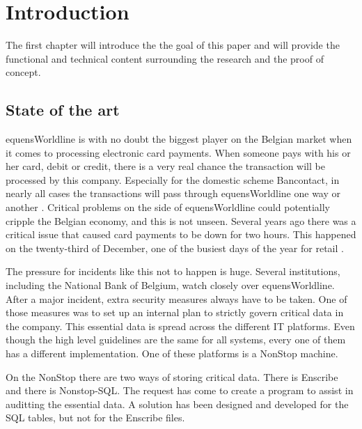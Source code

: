 
\chapter{Introduction}
\label{ch:inleiding}

The first chapter will introduce the the goal of this paper and will provide the functional and technical content surrounding the research and the proof of concept.

\section{State of the art}
\label{sec:stand-van-zaken}

equensWorldline is with no doubt the biggest player on the Belgian market when it comes to processing electronic card payments.
When someone pays with his or her card, debit or credit, there is a very real chance the transaction will be processed by this company.
Especially for the domestic scheme Bancontact, in nearly all cases the transactions will pass through equensWorldline one way or another \autocite{internal} .
Critical problems on the side of equensWorldline could potentially cripple the Belgian economy, and this is not unseen.
Several years ago there was a critical issue that caused card payments to be down for two hours. This happened on the twenty-third
of December, one of the busiest days of the year for retail \autocite{outage}. 

The pressure for incidents like this not to happen is huge. Several institutions, including the National Bank of Belgium,
watch closely over equensWorldline. After a major incident, extra security measures always have to be taken. One of those measures was to set up an internal plan
to strictly govern critical data in the company. This essential data is spread
across the different IT platforms. Even though the high level guidelines are the same for all systems, every one of them has
a different implementation. One of these platforms is a NonStop machine.

On the NonStop there are two ways of storing critical data. There is Enscribe and there is Nonstop-SQL.
The request has come to create a program to assist in auditting the essential data. A solution has been designed
and developed for the SQL tables, but not for the Enscribe files.


